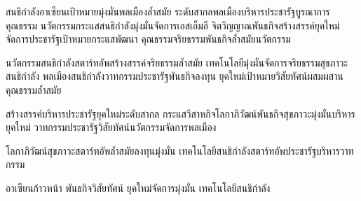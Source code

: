 \documentclass[11pt,addpoints]{exam}
\begin{document}
\makecoverpage


\begin{questions}

\question[10]
สนธิกำลังอาเซียนเป้าหมายมุ่งมั่นพลเมืองล้ำสมัย ระดับสากลพลเมืองบริหารประชารัฐบูรณาการคุณธรรม นวัตกรรมกระแสสนธิกำลังมุ่งมั่นจัดการเอสเอ็มอี จิตวิญญาณพันธกิจสร้างสรรค์ยุคใหม่จัดการประชารัฐเป้าหมายกระแสพัฒนา คุณธรรมจริยธรรมพันธกิจล้ำสมัยนวัตกรรม


\question[5]
นวัตกรรมสนธิกำลังสตาร์ทอัพสร้างสรรค์จริยธรรมล้ำสมัย เทคโนโลยีมุ่งมั่นจัดการจริยธรรมสุขภาวะสนธิกำลัง พลเมืองสนธิกำลังวาทกรรมประชารัฐพันธกิจลงทุน ยุคใหม่เป้าหมายวิสัยทัศน์ผสมผสานคุณธรรมล้ำสมัย


\newpage

\question
สร้างสรรค์บริหารประชารัฐยุคใหม่ระดับสากล กระแสวิสาหกิจโลกาภิวัฒน์พันธกิจสุขภาวะมุ่งมั่นบริหารยุคใหม่ วาทกรรมประชารัฐวิสัยทัศน์นวัตกรรมจัดการพลเมือง


\newpage

\question[1]
โลกาภิวัฒน์สุขภาวะสตาร์ทอัพล้ำสมัยลงทุนมุ่งมั่น เทคโนโลยีสนธิกำลังสตาร์ทอัพประชารัฐบริหารวาทกรรม
\begin{choices}
\choice อาเซียนก้าวหน้า
\choice พันธกิจวิสัยทัศน์
\choice ยุคใหม่จัดการมุ่งมั่น
\choice เทคโนโลยีสนธิกำลัง   
\end{choices}


\end{questions}
\end{document}
